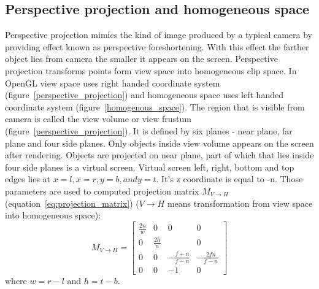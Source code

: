 \subsection{Perspective projection and homogeneous space}
Perspective projection mimics the kind of image produced by a typical camera by providing effect known as perspective foreshortening. With this effect the farther object lies from camera the smaller it appears on the screen. 
Perspective projection transforms points form view space into homogeneous clip space. In OpenGL view space uses right handed coordinate system (figure~\ref{perspective_projection}) and homogeneous space uses left handed coordinate system (figure~\ref{homogenous_space}). 
The region that is visible from camera is called the view volume or view frustum (figure~\ref{perspective_projection}). It is defined by six  planes - near plane, far plane and four side planes. Only objects inside view volume appears on the screen after rendering. Objects are projected on near plane, part of which that lies inside four side planes is a virtual screen.
Virtual screen left, right, bottom and top edges lies at $x=l, x=r, y=b, and y=t$. It's z coordinate is equal to -n. Those parameters are used to computed projection matrix $M_{V \to H }$ (equation~\ref{eq:projection_matrix}) ($V \to H$ means transformation from view space into homogeneous space):
\begin{equation}
\label{eq:projection_matrix}
M_{V \to H } = 
\begin{bmatrix}
\frac{2n}{w} & 0            & 0                & 0                \\ 
0            & \frac{2h}{n} &                  & 0                 \\ 
0            & 0            & -\frac{f+n}{f-n} & -\frac{2fn}{f-n} \\ 
0            & 0            & -1               & 0
\end{bmatrix}
\end{equation}
where $w=r-l$ and $h=t-b$.





